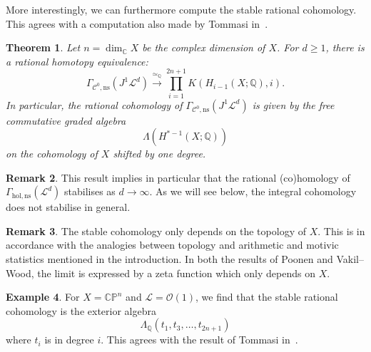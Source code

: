 \documentclass[a4paper]{amsart}
\newcommand{\bQ}{\mathbb Q}
\newcommand{\bC}{\mathbb C}
\newcommand{\bP}{\mathbb P}
\newcommand{\cC}{\mathcal C}
\newcommand{\cL}{\mathcal L}
\newcommand{\cO}{\mathcal O}
\newcommand{\lra}{\longrightarrow}
\theoremstyle{plain}
\newtheorem{theorem}{Theorem}[section]
\theoremstyle{definition}
\newtheorem{example}[theorem]{Example}
\newtheorem{remark}[theorem]{Remark}
\begin{document}
More interestingly, we can furthermore compute the stable rational cohomology. This agrees with a computation also made by Tommasi in~\cite{tommasi_stable_nodate}.
\begin{theorem}\label{thm:rationalcohomology}
Let $n = \dim_\bC X$ be the complex dimension of $X$. For $d \geq 1$, there is a rational homotopy equivalence:
\[
    \Gamma_{\cC^0,\mathrm{ns}}\left( J^1\cL^d \right) \overset{\simeq_\bQ}{\lra} \prod_{i=1}^{2n +1} K\left(H_{i-1}(X;\bQ), i\right).
\]
In particular, the rational cohomology of $\Gamma_{\cC^0, \mathrm{ns}}\left( J^1\cL^d \right)$ is given by the free commutative graded algebra
\[
    \Lambda\left(H^{*-1}(X;\bQ)\right)
\]
on the cohomology of $X$ shifted by one degree.
\end{theorem}

\begin{remark}\label{remark:cohomologicalstability}
This result implies in particular that the rational (co)homology of $\Gamma_{\mathrm{hol, ns}}\left( \cL^d \right)$ stabilises as $d \to \infty$. As we will see below, the integral cohomology does not stabilise in general.
\end{remark}
\begin{remark}
The stable cohomology only depends on the topology of $X$. This is in accordance with the analogies between topology and arithmetic and motivic statistics mentioned in the introduction. In both the results of Poonen and Vakil--Wood, the limit is expressed by a zeta function which only depends on $X$.
\end{remark}


\begin{example}
For $X = \bC\bP^n$ and $\cL = \cO(1)$, we find that the stable rational cohomology is the exterior algebra
\[
    \Lambda_\bQ(t_1, t_3, \ldots, t_{2n+1})
\]
where $t_i$ is in degree $i$. This agrees with the result of Tommasi in~\cite{tommasi_stable_2014}.
\end{example}
\end{document}
